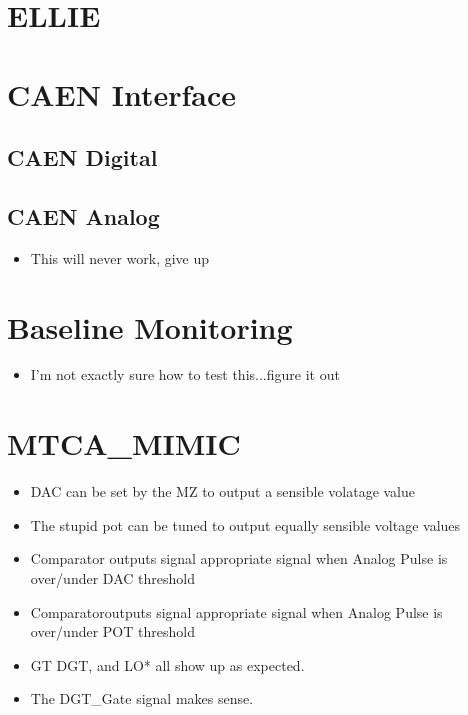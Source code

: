 \documentclass[11pt,a4paper]{article}
\begin{document}
\section{ELLIE}


 
\section{CAEN Interface}
\subsection{CAEN Digital}
\subsection{CAEN Analog}
\begin{itemize}
\item This will never work, give up
\end{itemize}
 
\section{Baseline Monitoring}
\begin{itemize}
\item I'm not exactly sure how to test this...figure it out
\end{itemize}



\section{MTCA\_MIMIC}
\begin{itemize}
\item DAC can be set by the MZ to output a sensible volatage value
\item The stupid pot can be tuned to output equally sensible voltage values
\item Comparator outputs signal appropriate signal when Analog Pulse is over/under
 DAC threshold
 \item Comparatoroutputs signal appropriate signal when Analog Pulse is over/under
 POT threshold


\item GT DGT, and LO* all show up as expected.
\item The DGT\_Gate signal makes sense.
\end{itemize}
\end{document}
